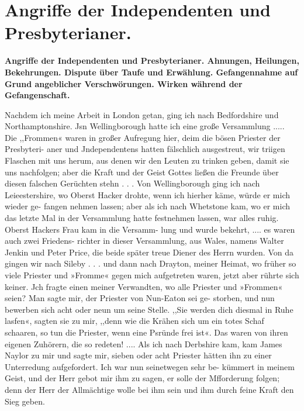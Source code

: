 


\chapter[Angriffe der Independenten und Presbyterianer.]{Angriffe der Independenten und Presbyterianer.}

\begin{center}
\textbf{Angriffe der Independenten und Presbyterianer. Ahnungen,
Heilungen, Bekehrungen. Dispute über Taufe und Erwählung.
Gefangennahme auf Grund angeblicher Verschwörungen. Wirken
während der Gefangenschaft.}
\end{center}


Nachdem ich meine Arbeit in London getan, ging ich nach
Bedfordshire und Northamptonshire. Jsn Wellingborough hatte
ich eine große Versammlung ..... Die ,,Frommen« waren in
großer Aufregung hier, deim die bösen Priester der Presbyteri-
aner und Jndependentens hatten fälschlich ausgestreut, wir triigen
Flaschen mit uns herum, aus denen wir den Leuten zu trinken
geben, damit sie uns nachfolgen; aber die Kraft und der Geist
Gottes ließen die Freunde über diesen falschen Gerüchten stehn . . .
Von Wellingborough ging ich nach Leieestershire, wo Oberst
Hacker drohte, wenn ich hierher käme, würde er mich wieder ge-
fangen nehmen lassen; aber als ich nach Whetstone kam, wo er
mich das letzte Mal in der Versammlung hatte festnehmen lassen,
war alles ruhig. Oberst Hackers Frau kam in die Versamm-
lung und wurde bekehrt, .... es waren auch zwei Friedens-
richter in dieser Versammlung, aus Wales, namens Walter
Jenkin und Peter Price, die beide später treue Diener des
Herrn wurden.
Von da gingen wir nach Sileby . . . und dann nach Drayton,
meiner Heimat, wo früher so viele Priester und »Fromme« gegen
mich aufgetreten waren, jetzt aber rührte sich keiner. Jch fragte
einen meiner Verwandten, wo alle Priester und »Frommen«
seien? Man sagte mir, der Priester von Nun-Eaton sei ge-
storben, und nun bewerben sich acht oder neun um seine Stelle.
,,Sie werden dich diesmal in Ruhe lasfen«, sagten sie zu mir,
,,denn wie die Krähen sich um ein totes Schaf schaaren, so tun die
Priester, wenn eine Psründe frei ist«. Das waren von ihren
eigenen Zuhörern, die so redeten! ....
Als ich nach Derbshire kam, kam James Naylor zu mir
und sagte mir, sieben oder acht Priester hätten ihn zu einer
Unterredung aufgefordert. Ich war nun seinetwegen sehr be-
kümmert in meinem Geist, und der Herr gebot mir ihm zu sagen,
er solle der Mfforderung folgen; denn der Herr der Allmächtige
wolle bei ihm sein und ihm durch feine Kraft den Sieg geben.


